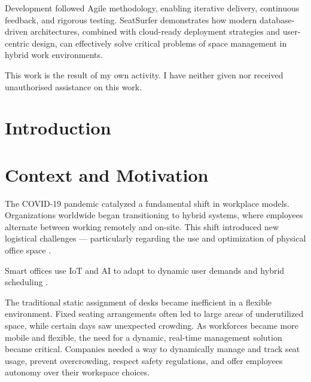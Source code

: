 \documentclass[12pt,a4paper]{report} %
\begin{document}
Development followed Agile methodology, enabling iterative delivery, continuous feedback, and rigorous testing. SeatSurfer demonstrates how modern database-driven architectures, combined with cloud-ready deployment strategies and user-centric design, can effectively solve critical problems of space management in hybrid work environments.

This work is the result of my own activity. I have neither given nor received
unauthorised assistance on this work.

\vspace{0.5cm}


\tableofcontents
\newpage

\section*{Introduction}

\section*{Context and Motivation}

The COVID-19 pandemic catalyzed a fundamental shift in workplace models. Organizations worldwide began transitioning to hybrid systems, where employees alternate between working remotely and on-site. This shift introduced new logistical challenges — particularly regarding the use and optimization of physical office space \cite{baker2021hybrid}.

Smart offices use IoT and AI to adapt to dynamic user demands and hybrid scheduling \cite{nayyar2021smart}.

The traditional static assignment of desks became inefficient in a flexible environment. Fixed seating arrangements often led to large areas of underutilized space, while certain days saw unexpected crowding. As workforces became more mobile and flexible, the need for a dynamic, real-time management solution became critical. Companies needed a way to dynamically manage and track seat usage, prevent overcrowding, respect safety regulations, and offer employees autonomy over their workspace choices.
\end{document}
